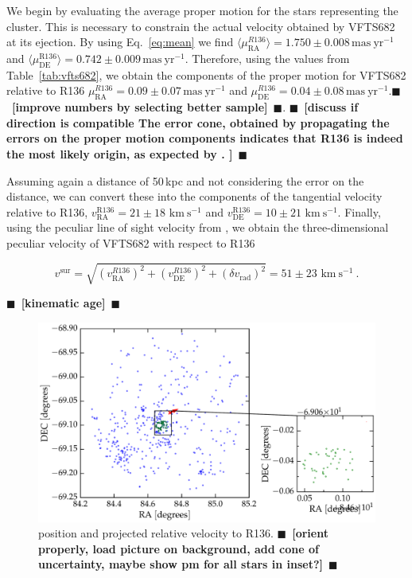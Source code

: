 \documentclass{aa}
\newcommand{\todo}[1]{{\large $\blacksquare$~\textbf{\color{red}[#1]}}~$\blacksquare$}
\newcommand{\kms}{{\,\mathrm{km\ s^{-1}}}}
\DeclareRobustCommand{\Eqref}[1]{Eq.~\ref{#1}}
\DeclareRobustCommand{\Tabref}[1]{Table~\ref{#1}}
\begin{document}
We begin by evaluating the average proper motion for the stars
representing the cluster. This is necessary to constrain the actual velocity
obtained by VFTS682 at its ejection. By using \Eqref{eq:mean} we find  
$\langle\mu_\mathrm{RA}^{R136}\rangle = 1.750\pm0.008\,\mathrm{mas\ yr^{-1}}$
and $\langle\mu_\mathrm{DE}^\mathrm{R136}\rangle =
0.742\pm0.009\,\mathrm{mas\ yr^{-1}}$. Therefore, using the values
from \Tabref{tab:vfts682}, we obtain the components of the proper
motion for VFTS682 relative to R136 $\mu^{R136}_\mathrm{RA} = 0.09\pm 0.07\,\mathrm{mas\ yr^{-1}}$ and $\mu^{R136}_\mathrm{DE} =
0.04\pm 0.08\,\mathrm{mas\ yr^{-1}}$.\todo{improve numbers by
  selecting better sample}.
\todo{discuss if direction is compatible
The error cone, obtained by
propagating the errors on the proper motion components indicates that
R136 is indeed the most likely origin, as expected by \cite{fujii:11,
  banerjee:12}.
}

Assuming again a distance of 50\,kpc and
not considering the error on the distance, we can convert these into
the components of the tangential velocity relative to R136,
$v^\mathrm{R136}_\mathrm{RA}=21 \pm 18\, \kms$ and $v^\mathrm{R136}_\mathrm{DE}=10
\pm 21\,\kms$. Finally, using the peculiar line of sight velocity
from \cite{bestenlehner:11}, we obtain the three-dimensional peculiar
velocity of VFTS682 with respect to R136

\begin{equation}
  \label{eq:speed_R136}
  v^\mathrm{sur} = \sqrt{\left(v^{R136}_\mathrm{RA}\right)^2
    +\left(v^{R136}_\mathrm{DE}\right)^2+\left(\delta v_\mathrm{rad}\right)^2} = 51 \pm 23
  \, \kms \ .
\end{equation}



\todo{kinematic age}


\begin{figure}[htbp]
  \centering
  \includegraphics[width=\textwidth]{./figures/main_plot}  
  \caption{position and projected relative velocity to
    R136. \todo{orient properly, load  picture on background, add cone
      of uncertainty, maybe show pm for all stars in inset?}}
  \label{fig:main}
\end{figure}
\end{document}

